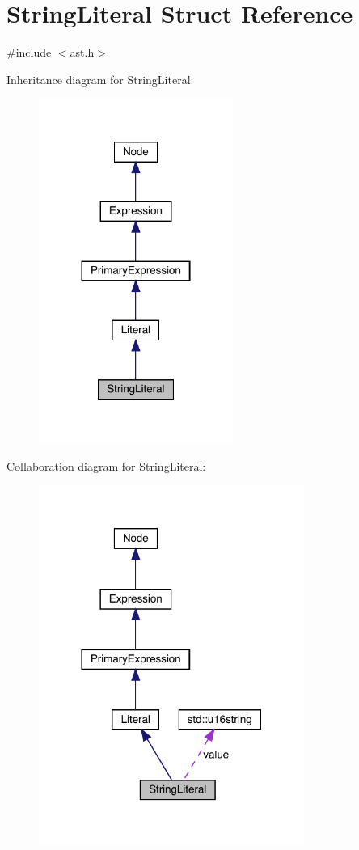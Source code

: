\hypertarget{struct_string_literal}{}\section{String\+Literal Struct Reference}
\label{struct_string_literal}


{\ttfamily \#include $<$ast.\+h$>$}



Inheritance diagram for String\+Literal\+:
\nopagebreak
\begin{figure}[H]
\begin{center}
\leavevmode
\includegraphics[width=180pt]{struct_string_literal__inherit__graph}
\end{center}
\end{figure}


Collaboration diagram for String\+Literal\+:
\nopagebreak
\begin{figure}[H]
\begin{center}
\leavevmode
\includegraphics[width=246pt]{struct_string_literal__coll__graph}
\end{center}
\end{figure}
